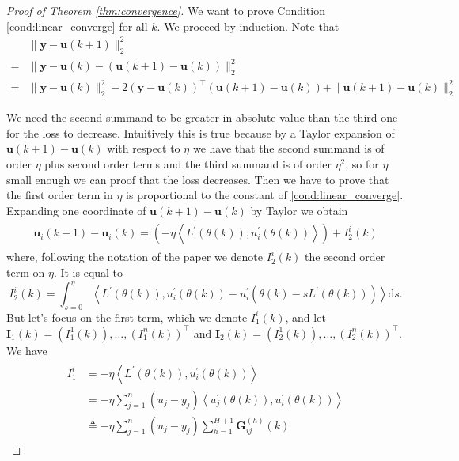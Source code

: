 \documentclass[11pt]{article}
\theoremstyle{plain}
\theoremstyle{definition}
\begin{document}
\begin{proof}[Proof of Theorem \ref{thm:convergence}]
    We want to prove Condition \ref{cond:linear_converge} for all $k$. We proceed by induction. Note that
    \begin{equation} \label{eq:decomposition}
        \begin{aligned} &\|\mathbf{y}-\mathbf{u}(k+1)\|_{2}^{2} \\=&\|\mathbf{y}-\mathbf{u}(k)-(\mathbf{u}(k+1)-\mathbf{u}(k))\|_{2}^{2} \\=&\|\mathbf{y}-\mathbf{u}(k)\|_{2}^{2}-2(\mathbf{y}-\mathbf{u}(k))^{\top}(\mathbf{u}(k+1)-\mathbf{u}(k))+\|\mathbf{u}(k+1)-\mathbf{u}(k)\|_{2}^{2} \end{aligned}
    \end{equation}

    We need the second summand to be greater in absolute value than the third one for the loss to decrease. Intuitively this is true because by a Taylor expansion of $\mathbf{u}(k+1)-\mathbf{u}(k)$ with respect to $\eta$ we have that the second summand is of order $\eta$ plus second order terms and the third summand is of order $\eta^2$, so for $\eta$ small enough we can proof that the loss decreases. Then we have to prove that the first order term in $\eta$ is proportional to the constant of \ref{cond:linear_converge}. Expanding one coordinate of  $\mathbf{u}(k+1)-\mathbf{u}(k)$ by Taylor we obtain
\begin{align*} 
 \begin{aligned}
     \mathbf{u}_i(k+1)-\mathbf{u}_i(k) = \left( -\eta\left\langle L^{\prime}(\theta(k)), u_{i}^{\prime}(\theta(k))\right\rangle \right) + I_2^i(k)
   \end{aligned}
\end{align*}
where, following the notation of the paper we denote $I_2^i(k)$ the second order term on $\eta$. It is equal to
\[
   I_2^i(k) = \int_{s=0}^{\eta}\left\langle L^{\prime}(\theta(k)), u_{i}^{\prime}(\theta(k))-u_{i}^{\prime}\left(\theta(k)-s L^{\prime}(\theta(k))\right)\right\rangle \mathrm{d}s.
\] 
But let's focus on the first term, which we denote $I_1^i(k)$, and let $\mathbf{I}_1(k) =(I_1^1(k)), \dots, (I_1^n(k))^\top $ and $\mathbf{I}_2(k) =(I_2^1(k)), \dots, (I_2^n(k))^\top $. We have 
\begin{align*} 
 \begin{aligned} I_{1}^{i} &=-\eta\left\langle L^{\prime}(\theta(k)), u_{i}^{\prime}(\theta(k))\right\rangle \\ &=-\eta \sum_{j=1}^{n}\left(u_{j}-y_{j}\right)\left\langle u_{j}^{\prime}(\theta(k)), u_{i}^{\prime}(\theta(k))\right\rangle \\ & \triangleq-\eta \sum_{j=1}^{n}\left(u_{j}-y_{j}\right) \sum_{h=1}^{H+1} \mathbf{G}_{i j}^{(h)}(k) \end{aligned}

\end{align*}
\end{proof}
\end{document}
